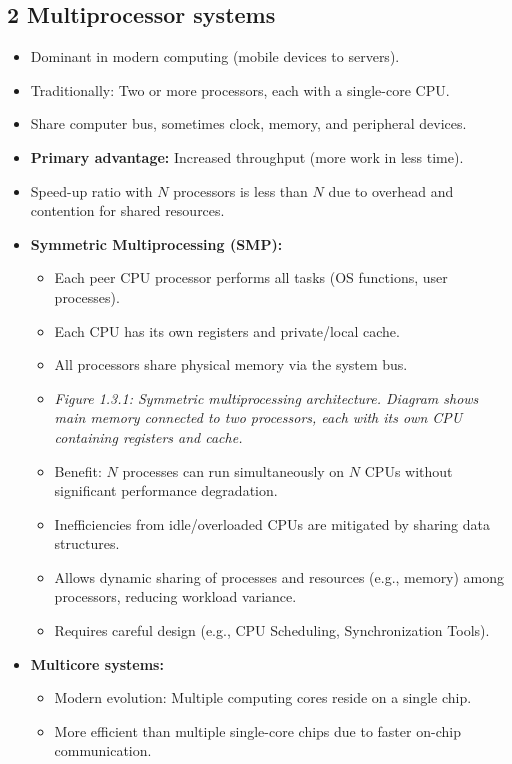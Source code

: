 \documentclass{article}
\begin{document}
\subsection*{2 Multiprocessor systems}
\begin{itemize}
    \item Dominant in modern computing (mobile devices to servers).
    \item Traditionally: Two or more processors, each with a single-core CPU.
    \item Share computer bus, sometimes clock, memory, and peripheral devices.
    \item \textbf{Primary advantage:} Increased throughput (more work in less time).
    \item Speed-up ratio with $N$ processors is less than $N$ due to overhead and contention for shared resources.
    \item \textbf{Symmetric Multiprocessing (SMP):}
    \begin{itemize}
        \item Each peer CPU processor performs all tasks (OS functions, user processes).
        \item Each CPU has its own registers and private/local cache.
        \item All processors share physical memory via the system bus.
        \item \textit{Figure 1.3.1: Symmetric multiprocessing architecture. Diagram shows main memory connected to two processors, each with its own CPU containing registers and cache.}
        \item Benefit: $N$ processes can run simultaneously on $N$ CPUs without significant performance degradation.
        \item Inefficiencies from idle/overloaded CPUs are mitigated by sharing data structures.
        \item Allows dynamic sharing of processes and resources (e.g., memory) among processors, reducing workload variance.
        \item Requires careful design (e.g., CPU Scheduling, Synchronization Tools).
    \end{itemize}
    \item \textbf{Multicore systems:}
    \begin{itemize}
        \item Modern evolution: Multiple computing cores reside on a single chip.
        \item More efficient than multiple single-core chips due to faster on-chip communication.

\end{itemize}
\end{itemize}
\end{document}
